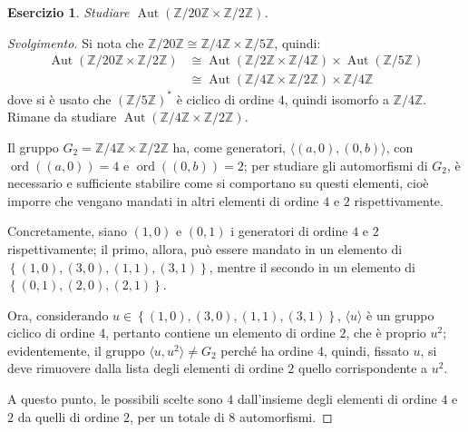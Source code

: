 \documentclass[11pt]{article}
\theoremstyle{style}
\newtheorem{esercizio}{Esercizio}[section]
\newenvironment{svolgimento}{\renewcommand\qedsymbol{$\blacksquare$}\begin{proof}[Svolgimento]}{\end{proof}}
\numberwithin{equation}{subsection}
\begin{document}
\begin{esercizio}
Studiare $\operatorname{Aut} (\mathbb{Z} / 20 \mathbb{Z} \times \mathbb{Z} / 2 \mathbb{Z})$.
\end{esercizio}
\begin{svolgimento}
	Si nota che $\mathbb{Z} / 20 \mathbb{Z}\cong \mathbb{Z}/4 \mathbb{Z} \times  \mathbb{Z} / 5 \mathbb{Z}$, quindi:
	\[
		\begin{split}
			\operatorname{Aut} (\mathbb{Z}/20\mathbb{Z}\times \mathbb{Z}/2\mathbb{Z})&\cong \operatorname{Aut} (\mathbb{Z}/2\mathbb{Z} \times \mathbb{Z} / 4\mathbb{Z}) \times \operatorname{Aut} (\mathbb{Z}/5\mathbb{Z}) \\
												 &\cong\operatorname{Aut} (\mathbb{Z}/4\mathbb{Z}\times \mathbb{Z}/2\mathbb{Z}) \times \mathbb{Z}/4\mathbb{Z}
		\end{split}
	\] 
	dove si \`e usato che $(\mathbb{Z}/5\mathbb{Z})^*$ \`e ciclico di ordine $4$, quindi isomorfo a $\mathbb{Z}/4\mathbb{Z}$.
	Rimane da studiare $\operatorname{Aut} (\mathbb{Z}/4\mathbb{Z}\times \mathbb{Z}/2\mathbb{Z})$.

	Il gruppo $G_2 = \mathbb{Z}/4\mathbb{Z} \times  \mathbb{Z}/2\mathbb{Z}$ ha, come generatori, $\langle (a,0),(0,b) \rangle$, con $\operatorname{ord}((a,0)) = 4$ e $\operatorname{ord}((0,b)) =2$; per studiare gli automorfismi di $G_2$, \`e necessario e sufficiente stabilire come si comportano su questi elementi, cio\`e imporre che vengano mandati in altri elementi di ordine $4$ e $2 $ rispettivamente.

	Concretamente, siano $(1,0)$ e $(0,1)$ i generatori di ordine $4$ e $2 $ rispettivamente; il primo, allora, pu\`o essere mandato in un elemento di $\left\{ (1,0), (3,0),(1,1),(3,1) \right\} $, mentre il secondo in un elemento di $\left\{ (0,1), (2,0) , (2,1) \right\} $.

	Ora, considerando $u \in \left\{ (1,0), (3,0),(1,1),(3,1) \right\} $, $\langle u \rangle$ \`e un gruppo ciclico di ordine 4, pertanto contiene un elemento di ordine $2$, che \`e proprio $u^2$; evidentemente, il gruppo $\langle u,u^2 \rangle\neq G_2$ perch\'e ha ordine $4$, quindi, fissato $u$, si deve rimuovere dalla lista degli elementi di ordine $2$ quello corrispondente a $u^2$.

	A questo punto, le possibili scelte sono $4$ dall'insieme degli elementi di ordine $4$ e $2 $ da quelli di ordine $2$, per un totale di $8$ automorfismi.


\end{svolgimento}
\end{document}
